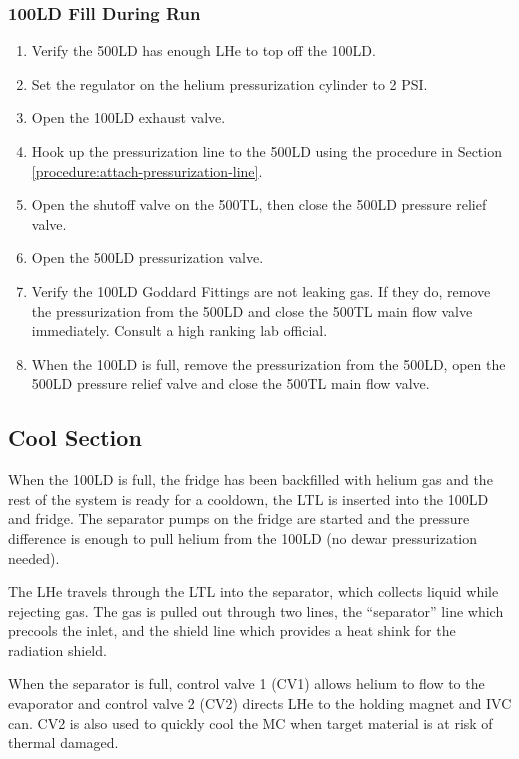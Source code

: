 \subsubsection{100LD Fill During Run}

\begin{enumerate}
 
 \item Verify the 500LD has enough LHe to top off the 100LD.
 \item Set the regulator on the helium pressurization cylinder to 2 PSI.
 \item Open the 100LD exhaust valve.
 \item Hook up the pressurization line to the 500LD using the procedure in Section \ref{procedure:attach-pressurization-line}.
 \item Open the shutoff valve on the 500TL, then close the 500LD pressure relief valve.
 \item Open the 500LD pressurization valve.
 \item Verify the 100LD Goddard Fittings are not leaking gas.  If they do, remove the pressurization from the 500LD and close the 500TL main flow valve immediately.  Consult a high ranking lab official.
 \item When the 100LD is full, remove the pressurization from the 500LD, open the 500LD pressure relief valve and close the 500TL main flow valve.
 
\end{enumerate}


\subsection{Cool \hef{} Section}

When the 100LD is full, the fridge has been backfilled with helium gas and the rest of the system is ready for a cooldown, the LTL is inserted into the 100LD and fridge.  The separator pumps on the fridge are started and the pressure difference is enough to pull helium from the 100LD (no dewar pressurization needed).

The LHe travels through the LTL into the separator, which collects liquid while rejecting gas.  The gas is pulled out through two lines, the ``separator'' line which precools the \het{} inlet, and the shield line which provides a heat shink for the radiation shield.

When the separator is full, control valve 1 (CV1) allows helium to flow to the evaporator and control valve 2 (CV2) directs LHe to the holding magnet and IVC can.  CV2 is also used to quickly cool the MC when target material is at risk of thermal damaged.

